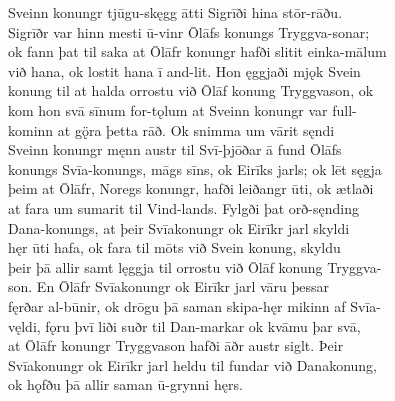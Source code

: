 \documentclass[12pt,letterpaper]{book}
\begin{document}
\resetlinenumber
\begin{linenumbers}

Sveinn konungr tjūgu-skęgg ātti Sigrīði hina stōr-rāðu.\\
Sigrīðr var hinn mesti ū-vinr Ōlāfs konungs Tryggva-sonar;\\
ok fann þat til saka at Ōlāfr konungr hafði slitit einka-mālum\\
við hana, ok lostit hana ī and-lit.  Hon ęggjaði mjǫk Svein\\
konung til at halda orrostu við Ōlāf konung Tryggvason, ok\\
kom hon svā sīnum for-tǫlum at Sveinn konungr var full-\\
kominn at gǫ̈ra þetta rāð.  Ok snimma um vārit sęndi\\
Sveinn konungr męnn austr til Svī-þjōðar ā fund Ōlāfs\\
konungs Svīa-konungs, māgs sīns, ok Eirīks jarls; ok lēt sęgja\\
þeim at Ōlāfr, Noregs konungr, hafði leiðangr ūti, ok ætlaði\\
at fara um sumarit til Vind-lands.  Fylgði þat orð-sęnding\\
Dana-konungs, at þeir Svīakonungr ok Eirīkr jarl skyldi\\
hęr ūti hafa, ok fara til mōts við Svein konung, skyldu\\
þeir þā allir samt lęggja til orrostu við Ōlāf konung Tryggva-\\
son.  En Ōlāfr Svīakonungr ok Eirīkr jarl vāru þessar\\
fęrðar al-būnir, ok drōgu þā saman skipa-hęr mikinn af Svīa-\\
vęldi, fǫru þvī liði suðr til Dan-markar ok kvāmu þar svā,\\
at Ōlāfr konungr Tryggvason hafði āðr austr siglt.  Þeir\\
Svīakonungr ok Eirīkr jarl heldu til fundar við Danakonung,\\
ok hǫfðu þā allir saman ū-grynni hęrs.


\end{linenumbers}
\end{document}
